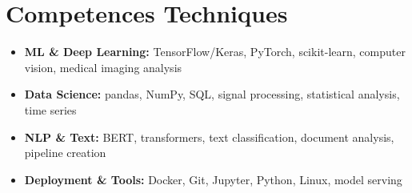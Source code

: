 \documentclass[a4paper,11pt]{article}
\begin{document}
\section{Competences Techniques}
\begin{itemize}[leftmargin=*, nosep]
    \item \small{\textbf{ML \& Deep Learning:} TensorFlow/Keras, PyTorch, scikit-learn, computer vision, medical imaging analysis}
    \item \small{\textbf{Data Science:} pandas, NumPy, SQL, signal processing, statistical analysis, time series}
    \item \small{\textbf{NLP \& Text:} BERT, transformers, text classification, document analysis, pipeline creation}
    \item \small{\textbf{Deployment \& Tools:} Docker, Git, Jupyter, Python, Linux, model serving}
\end{itemize}
\end{document}
